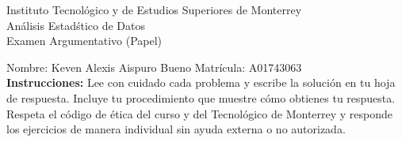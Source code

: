 \documentclass[10pt]{report}
\begin{document}
\begin{center}
{\large Instituto Tecnol\'{o}gico y de Estudios Superiores de Monterrey \\
An\'alisis Estad\'stico de Datos } \\
Examen Argumentativo (Papel)
\end{center}

Nombre: \underline{\hspace*{.2in}}
Keven Alexis Aispuro Bueno
\underline{\hspace*{.2in}} \quad Matr\'icula:\underline{\hspace*{.2in}}
A01743063
\underline{\hspace*{.2in}} \\

{\bf Instrucciones:} Lee con cuidado cada problema y escribe la soluci\'on
en tu hoja de respuesta. Incluye tu procedimiento que muestre c\'omo obtienes tu respuesta.  Respeta el c\'odigo de \'etica del curso y del Tecnol\'ogico de Monterrey y responde los ejercicios de manera individual sin ayuda externa o no autorizada.
\end{document}
